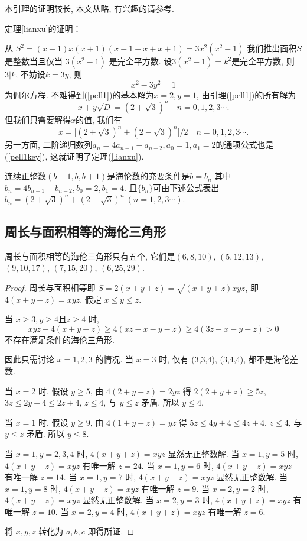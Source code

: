 \documentclass[12pt]{article}
\begin{document}
本引理的证明较长, 本文从略, 有兴趣的请参考\cite{kezhao}. 

定理\ref{lianxu}的证明：\par        
    从 $S^2=(x-1)x(x+1)(x-1+x+x+1)=3x^2(x^2-1)$ 我们推出面积$S$是整数当且仅当 $3(x^2-1)$ 是完全平方数. 设$3(x^2-1)=k^2$是完全平方数, 则$3|k$, 不妨设$k=3y$, 则
    \begin{equation}\label{pell1}
        x^2-3y^2=1
    \end{equation}
    为佩尔方程. 不难得到(\ref{pell1})的基本解为$x=2,y=1$, 由引理(\ref{pell1})的所有解为
    \[x+y\sqrt D=(2+\sqrt 3)^n\quad n=0,1,2,3\cdots.\]
    但我们只需要解得$x$的值, 我们有
    \begin{equation}\label{pell1key}
        x=\big[(2+\sqrt3)^n+(2-\sqrt3)^n\big]/2\quad n=0,1,2,3\cdots.
    \end{equation}
    另一方面, 二阶递归数列$a_n=4a_{n-1}-a_{n-2},a_0=1,a_1=2$的通项公式也是(\ref{pell1key}), 这就证明了定理(\ref{lianxu}).
        
\begin{corollary}
    连续正整数$(b-1,b,b+1)$是海伦数的充要条件是$b=b_n$ 其中 $b_n=4b_{n-1}-b_{n-2},b_0=2,b_1=4$. 且$\{b_n\}$可由下述公式表出$b_n=(2+\sqrt3)^n+(2-\sqrt3)^n\ (n=1,2,3\cdots)$.
\end{corollary}
  
        
\subsection{周长与面积相等的海伦三角形}
\begin{theorem}
    周长与面积相等的海伦三角形只有五个, 它们是$(6,8,10)$, $(5,12,13)$, $(9,10,17)$, $(7,15,20)$, $(6,25,29)$.
\end{theorem}
\begin{proof}
    周长与面积相等即 $S=2(x+y+z)=\sqrt{(x+y+z)xyz}$, 即 $4(x+y+z)=xyz$. 假定 $x\le y\le z$.\par
    当 $x\ge3,y\ge4\text{且}z\ge4$ 时, 
    \[xyz-4(x+y+z)\ge4(xz-x-y-z)\ge4(3z-x-y-z)>0\]
    不存在满足条件的海伦三角形. \par
    因此只需讨论 $x=1,2,3$ 的情况. 当 $x=3$ 时, 仅有 (3,3,4), (3,4,4), 都不是海伦差数. 

    当 $x=2$ 时, 假设 $y\ge5$, 由 $4(2+y+z)=2yz$ 得 $2(2+y+z)\ge5z$, $3z\le2y+4\le2z+4$, $z\le4$, 与 $y\le z$ 矛盾. 所以 $y\le4$.\par
    当 $x=1$ 时, 假设 $y\ge9$, 由 $4(1+y+z)=yz$ 得 $5z\le4y+4\le4z+4$, $z\le4$, 与 $y\le z$ 矛盾. 所以 $y\le8$.\par
    当 $x=1,y=2,3,4$ 时, $4(x+y+z)=xyz$ 显然无正整数解. 
    当 $x=1,y=5$ 时, $4(x+y+z)=xyz$ 有唯一解 $z=24$. 
    当 $x=1,y=6$ 时, $4(x+y+z)=xyz$ 有唯一解 $z=14$. 
    当 $x=1,y=7$ 时, $4(x+y+z)=xyz$ 显然无正整数解.  
    当 $x=1,y=8$ 时, $4(x+y+z)=xyz$ 有唯一解 $z=9$.  
    当 $x=2,y=2$ 时, $4(x+y+z)=xyz$ 显然无正整数解.  
    当 $x=2,y=3$ 时, $4(x+y+z)=xyz$ 有唯一解 $z=10$.  
    当 $x=2,y=4$ 时, $4(x+y+z)=xyz$ 有唯一解 $z=6$. \par
    将 $x,y,z$ 转化为 $a,b,c$ 即得所证. 
\end{proof}
\end{document}
